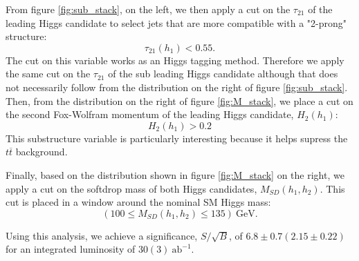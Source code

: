 From figure \ref{fig:sub_stack}, on the left, we then apply a cut on the $\tau_{21}$ of the leading Higgs candidate to select jets that are more compatible with a "2-prong" structure:
\begin{equation}
	\tau_{21}(h_1)<0.55.
\end{equation}
The cut on this variable works as an Higgs tagging method. Therefore we apply the same cut on the $\tau_{21}$ of the sub leading Higgs candidate although that does not necessarily follow from the distribution on the right of figure \ref{fig:sub_stack}.
Then, from the distribution on the right of figure \ref{fig:M_stack}, we place a cut on the second Fox-Wolfram momentum of the leading Higgs candidate, $H_2 (h_1)$:
\begin{equation}
	H_2 (h_1)>0.2
\end{equation}
This substructure variable is particularly interesting because it helps supress the $t\overline{t}$ background.

Finally, based on the distribution shown in figure \ref{fig:M_stack} on the right, we apply a cut on the softdrop mass of both Higgs candidates, $M_{SD}(h_1,h_2)$. This cut is placed in a window around the nominal SM Higgs mass:
\begin{equation}
	(100\leq M_{SD}(h_1,h_2)\leq 135) ~\text{GeV}.
\end{equation}

Using this analysis, we achieve a significance, $S/\sqrt{B}$, of $6.8\pm0.7(2.15\pm0.22)$ for an integrated luminosity of $30(3)~\text{ab}^{-1}$.

